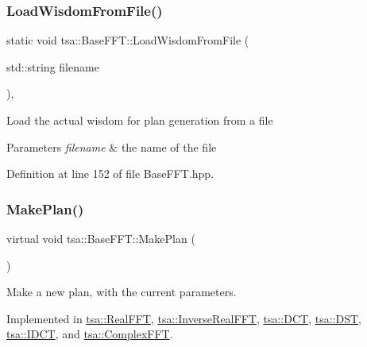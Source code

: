 \mbox{\label{classtsa_1_1_base_f_f_t_a53ccc1ae425bb9f91adbd5562ecb9131}} 
\subsubsection{\texorpdfstring{Load\+Wisdom\+From\+File()}{LoadWisdomFromFile()}}
{\footnotesize\ttfamily static void tsa\+::\+Base\+F\+F\+T\+::\+Load\+Wisdom\+From\+File (\begin{DoxyParamCaption}\item[{std\+::string}]{filename }\end{DoxyParamCaption})\hspace{0.3cm}{\ttfamily [inline]}, {\ttfamily [static]}}

Load the actual wisdom for plan generation from a file


\begin{DoxyParams}{Parameters}
{\em filename} & the name of the file \\
\hline
\end{DoxyParams}


Definition at line 152 of file Base\+F\+F\+T.\+hpp.

\mbox{\label{classtsa_1_1_base_f_f_t_a9af0c36413173821cac8dbdce9cfe3b4}} 
\subsubsection{\texorpdfstring{Make\+Plan()}{MakePlan()}}
{\footnotesize\ttfamily virtual void tsa\+::\+Base\+F\+F\+T\+::\+Make\+Plan (\begin{DoxyParamCaption}{ }\end{DoxyParamCaption})\hspace{0.3cm}{\ttfamily [pure virtual]}}

Make a new plan, with the current parameters. 

Implemented in \hyperlink{classtsa_1_1_real_f_f_t_a6684b1abf6f9de2d7c546c3556ef0a0e}{tsa\+::\+Real\+F\+FT}, \hyperlink{classtsa_1_1_inverse_real_f_f_t_ae5b45701f989efce89c6c336ec78c189}{tsa\+::\+Inverse\+Real\+F\+FT}, \hyperlink{classtsa_1_1_d_c_t_a2d24c07a7b3f96b16056eee1ab9bad89}{tsa\+::\+D\+CT}, \hyperlink{classtsa_1_1_d_s_t_a066a93f3ddbf56f8e5c67067156ebb9a}{tsa\+::\+D\+ST}, \hyperlink{classtsa_1_1_i_d_c_t_a3add06359e79507105820496b324ad7a}{tsa\+::\+I\+D\+CT}, and \hyperlink{classtsa_1_1_complex_f_f_t_a05acda3ab3fbb2ead70421e587cdd210}{tsa\+::\+Complex\+F\+FT}.

